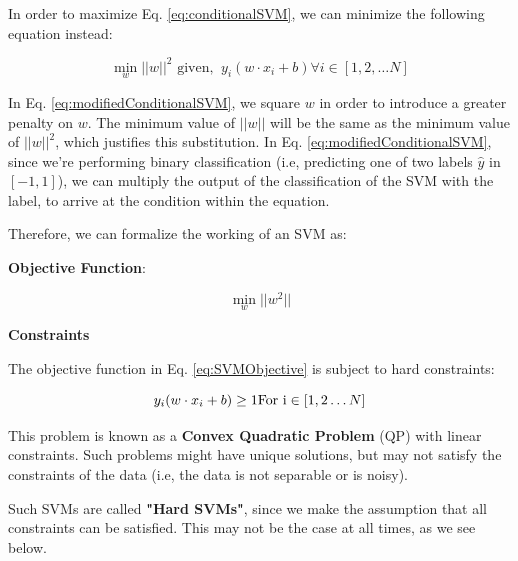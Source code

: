 \documentclass[11pt]{article}
\begin{document}
In order to maximize Eq. \ref{eq:conditionalSVM}, we can minimize the following equation instead:

\begin{equation}\label{eq:modifiedConditionalSVM}
    \min_{w} ||w||^{2} \text{ given, } \ y_{i}(w \cdot x_{i} + b) \forall i \in [1, 2, \dots N]
\end{equation}

In Eq. \ref{eq:modifiedConditionalSVM}, we square $w$ in order to introduce a greater penalty on $w$. The minimum value of $||w||$ will be the same as the minimum value of $||w||^2$, which justifies this substitution. In Eq. \ref{eq:modifiedConditionalSVM}, since we're performing binary classification (i.e, predicting one of two labels $\hat{y}$ in $[-1, 1]$), we can multiply the output of the classification of the SVM with the label, to arrive at the condition within the equation.

Therefore, we can formalize the working of an SVM as:

\textbf{Objective Function}:

\begin{equation}\label{eq:SVMObjective}
    \min_{w} ||w^2||
\end{equation}

\textbf{Constraints}

The objective function in Eq. \ref{eq:SVMObjective} is subject to hard constraints:

\begin{equation}
    y_{i}(w \cdot x_{i} + b) \geq 1 \\
    \text{For i}  \in [1, 2 \dots N]
\end{equation}

This problem is known as a \textbf{Convex Quadratic Problem} (QP) with linear constraints. Such problems might have unique solutions, but may not satisfy the constraints of the data (i.e, the data is not separable or is noisy).

Such SVMs are called \textbf{"Hard SVMs"}, since we make the assumption that all constraints can be satisfied. This may not be the case at all times, as we see below.


\end{document}
